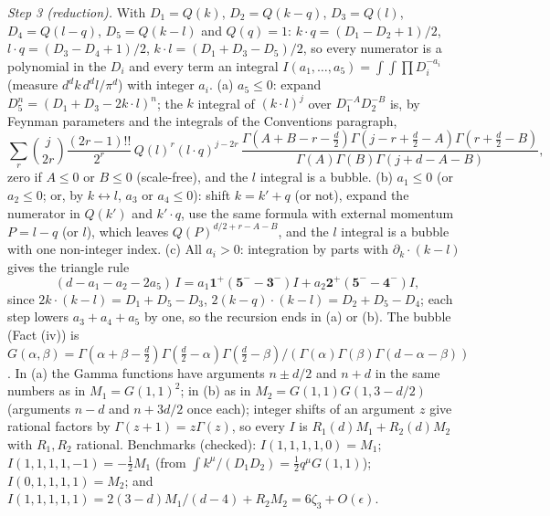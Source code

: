 \emph{Step 3 (reduction).} With $D_{1} = Q(k)$, $D_{2} = Q(k-q)$, $D_{3} = Q(l)$, $D_{4} = Q(l-q)$, $D_{5} = Q(k-l)$ and $Q(q) = 1$: $k\cdot q = (D_{1} - D_{2} + 1)/2$, $l\cdot q = (D_{3} - D_{4} + 1)/2$, $k\cdot l = (D_{1} + D_{3} - D_{5})/2$, so every numerator is a polynomial in the $D_{i}$ and every term an integral $I(a_{1}, \ldots, a_{5}) = \int\int\prod D_{i}^{-a_{i}}$ (measure $d^{d}k\,d^{d}l/\pi^{d}$) with integer $a_{i}$. (a) $a_{5} \le 0$: expand $D_{5}^{n} = (D_{1} + D_{3} - 2k\cdot l)^{n}$; the $k$ integral of $(k\cdot l)^{j}$ over $D_{1}^{-A}D_{2}^{-B}$ is, by Feynman parameters and the integrals of the Conventions paragraph,
\[
\sum_{r}\binom{j}{2r}\frac{(2r-1)!!}{2^{r}}\,Q(l)^{r}(l\cdot q)^{j-2r}\,\frac{\Gamma(A + B - r - \tfrac d2)\Gamma(j - r + \tfrac d2 - A)\Gamma(r + \tfrac d2 - B)}{\Gamma(A)\Gamma(B)\Gamma(j + d - A - B)},
\]
zero if $A \le 0$ or $B \le 0$ (scale-free), and the $l$ integral is a bubble. (b) $a_{1} \le 0$ (or $a_{2} \le 0$; or, by $k \leftrightarrow l$, $a_{3}$ or $a_{4} \le 0$): shift $k = k' + q$ (or not), expand the numerator in $Q(k')$ and $k'\cdot q$, use the same formula with external momentum $P = l - q$ (or $l$), which leaves $Q(P)^{d/2 + r - A - B}$, and the $l$ integral is a bubble with one non-integer index. (c) All $a_{i} > 0$: integration by parts with $\partial_{k}\cdot(k - l)$ gives the triangle rule
\[
(d - a_{1} - a_{2} - 2a_{5})\,I = a_{1}\mathbf{1}^{+}(\mathbf{5}^{-} - \mathbf{3}^{-})I + a_{2}\mathbf{2}^{+}(\mathbf{5}^{-} - \mathbf{4}^{-})I,
\]
since $2k\cdot(k - l) = D_{1} + D_{5} - D_{3}$, $2(k - q)\cdot(k - l) = D_{2} + D_{5} - D_{4}$; each step lowers $a_{3} + a_{4} + a_{5}$ by one, so the recursion ends in (a) or (b). The bubble (Fact (iv)) is $G(\alpha, \beta) = \Gamma(\alpha + \beta - \tfrac d2)\Gamma(\tfrac d2 - \alpha)\Gamma(\tfrac d2 - \beta)/(\Gamma(\alpha)\Gamma(\beta)\Gamma(d - \alpha - \beta))$ \cite{ChetyrkinTkachov1981}. In (a) the Gamma functions have arguments $n \pm d/2$ and $n + d$ in the same numbers as in $M_{1} = G(1,1)^{2}$; in (b) as in $M_{2} = G(1,1)G(1, 3 - d/2)$ (arguments $n - d$ and $n + 3d/2$ once each); integer shifts of an argument $z$ give rational factors by $\Gamma(z + 1) = z\Gamma(z)$, so every $I$ is $R_{1}(d)M_{1} + R_{2}(d)M_{2}$ with $R_{1}, R_{2}$ rational. Benchmarks (checked): $I(1,1,1,1,0) = M_{1}$; $I(1,1,1,1,-1) = -\tfrac12M_{1}$ (from $\int k^{\mu}/(D_{1}D_{2}) = \tfrac12q^{\mu}G(1,1)$); $I(0,1,1,1,1) = M_{2}$; and $I(1,1,1,1,1) = 2(3 - d)M_{1}/(d - 4) + R_{2}M_{2} = 6\zeta_{3} + O(\epsilon)$.

